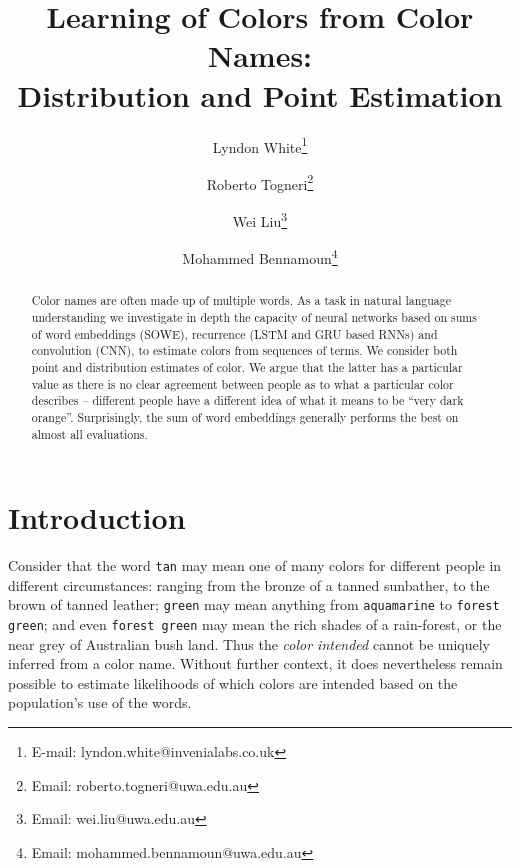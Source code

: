 \documentclass[]{clv3}
\begin{document}
\title{Learning of Colors from Color Names: \\ Distribution and Point Estimation}
\author{Lyndon White\thanks{E-mail: {lyndon.white@invenialabs.co.uk}}}

\author{Roberto Togneri\thanks{Email: {roberto.togneri@uwa.edu.au}}}
\author{Wei Liu\thanks{Email: {wei.liu@uwa.edu.au}}}
\author{Mohammed Bennamoun\thanks{Email: {mohammed.bennamoun@uwa.edu.au}}}



\maketitle
%
\begin{abstract}
Color names are often made up of multiple words.
As a task in natural language understanding we investigate in depth the capacity of neural networks based on sums of word embeddings (SOWE), recurrence (LSTM and GRU based RNNs) and convolution (CNN), to estimate colors from sequences of terms.
We consider both point and distribution estimates of color.
We argue that the latter has a particular value as there is no clear agreement between people as to what a particular color describes -- different people have a different idea of what it means to be ``very dark orange''.
Surprisingly, the sum of word embeddings generally performs the best on almost all evaluations.
\end{abstract}

\section{Introduction}\label{sec:intro}

Consider that the word \texttt{tan} may mean one of many colors for different people in different circumstances: ranging from the bronze of a tanned sunbather, to the brown of tanned leather;
\texttt{green} may mean anything from \texttt{aquamarine} to \texttt{forest green};
and even \texttt{forest green} may mean the rich shades of a rain-forest, or the near grey of Australian bush land.
Thus the \emph{color intended} cannot be uniquely inferred from a color name. Without further context, it does nevertheless remain possible to estimate likelihoods of which colors are intended based on the population's use of the words.
\end{document}

